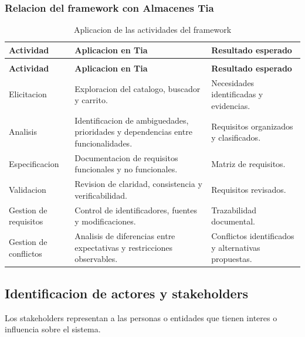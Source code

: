 \documentclass[12pt,a4paper]{article}
\renewcommand{\arraystretch}{1.17}
\begin{document}
\subsubsection{Relacion del framework con Almacenes Tia}

\begingroup
\footnotesize
\setlength{\tabcolsep}{3pt}
\renewcommand{\arraystretch}{1.25}
\begin{longtable}{|>{\raggedright\arraybackslash}p{2.65cm}|>{\raggedright\arraybackslash}p{6.05cm}|>{\raggedright\arraybackslash}p{5.65cm}|}
\caption{Aplicacion de las actividades del framework}\\
\hline
\textbf{Actividad} &
\textbf{Aplicacion en Tia} &
\textbf{Resultado esperado} \\
\hline
\endfirsthead
\multicolumn{3}{c}{\textit{Continuación: Aplicacion de las actividades del framework}}\\
\hline
\textbf{Actividad} &
\textbf{Aplicacion en Tia} &
\textbf{Resultado esperado} \\
\hline
\endhead
Elicitacion &
Exploracion del catalogo, buscador y carrito. &
Necesidades identificadas y evidencias. \\
\hline
Analisis &
Identificacion de ambiguedades, prioridades y
dependencias entre funcionalidades. &
Requisitos organizados y clasificados. \\
\hline
Especificacion &
Documentacion de requisitos funcionales y no
funcionales. &
Matriz de requisitos. \\
\hline
Validacion &
Revision de claridad, consistencia y verificabilidad. &
Requisitos revisados. \\
\hline
Gestion de requisitos &
Control de identificadores, fuentes y modificaciones. &
Trazabilidad documental. \\
\hline
Gestion de conflictos &
Analisis de diferencias entre expectativas y
restricciones observables. &
Conflictos identificados y alternativas propuestas. \\
\hline
\end{longtable}
\endgroup

\subsection{Identificacion de actores y stakeholders}

Los stakeholders representan a las personas o entidades
que tienen interes o influencia sobre el sistema.
\end{document}
